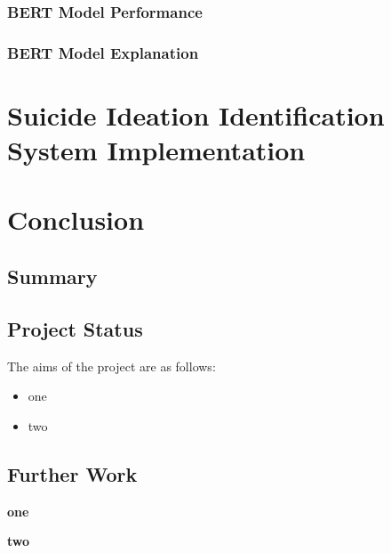 \documentclass[ %
                    author={Louis Wang},
                supervisor={Dr. Qiang Liu},
                    degree={MSc},
                     title={Identification of Suicide Ideation in Texts},
                      type={},
                      year={2024}]{dissertation}
\begin{document}
\subsection{BERT Model Performance}

\subsection{BERT Model Explanation}


\chapter{Suicide Ideation Identification System Implementation}
\label{chap:implementation}


\chapter{Conclusion}
\label{chap:conclusion}

\section{Summary}

\noindent

\section{Project Status}

\noindent
The aims of the project are as follows:

\begin{itemize}
      \item one
      \item two
\end{itemize}

\section{Further Work}

\noindent

\textbf{one}

\textbf{two}


\end{document}
